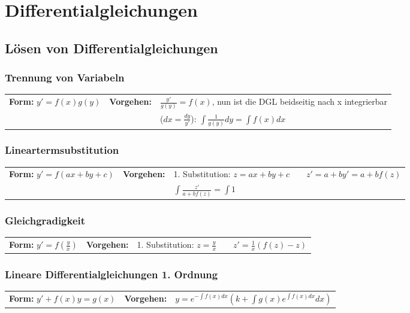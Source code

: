 \section{Differentialgleichungen}

\subsection{Lösen von Differentialgleichungen}

\subsubsection{Trennung von Variabeln }
\begin{tabular}{p{4cm}p{1.5cm}p{10.5cm}}
\textbf{Form:} $y' = f(x) g(y)$ &
\textbf{Vorgehen:}              &
$\frac{y'}{g(y)} = f(x)$, nun ist die DGL beidseitig nach x integrierbar\\  &&
($dx = \frac{dy}{y'}$): $\int \frac{1}{g(y)} dy = \int f(x) dx$ 
\end{tabular}

\subsubsection{Lineartermsubstitution }
\begin{tabular}{p{4cm}p{1.5cm}p{10.5cm}}
\textbf{Form:} $y'=f(ax+by+c)$   &
\textbf{Vorgehen:}               &
1. Substitution: $z=ax+by+c \qquad z'=a+by' =a+bf(z)$\\ &&
$\int\frac{z'}{a+bf(z)} = \int 1$
\end{tabular}

\subsubsection{Gleichgradigkeit}
\begin{tabular}{p{4cm}p{1.5cm}p{10.5cm}}
\textbf{Form:} $y'=f(\frac{y}{x})$ &
\textbf{Vorgehen:}                &
1. Substitution: $z=\frac{y}{x} \qquad
z'=\frac{1}{x}(f(z)-z)$
\end{tabular}

\subsubsection{Lineare Differentialgleichungen 1. Ordnung }
\begin{tabular}{p{4cm}p{1.5cm}p{10.5cm}}
\textbf{Form:} $ y'+f(x)y = g(x) $ &
\textbf{Vorgehen:}                 &
$ y=e^{-\int f(x) dx}(k+\int g(x)e^{\int f(x)dx}dx)$
\end{tabular}

